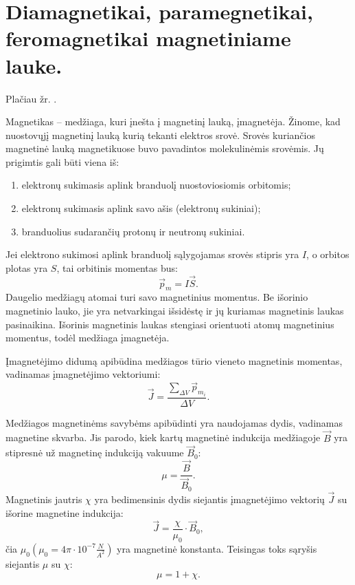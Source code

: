 \section{Diamagnetikai, paramegnetikai, feromagnetikai magnetiniame lauke.}

Plačiau žr. \cite[77p.]{elektra-magnetizmas}.

Magnetikas – medžiaga, kuri įnešta į magnetinį lauką, įmagnetėja.
Žinome, kad nuostovųjį magnetinį lauką kurią tekanti elektros
srovė. Srovės kuriančios magnetinė lauką magnetikuose buvo
pavadintos molekulinėmis srovėmis. Jų prigimtis gali būti viena iš:
\begin{enumerate}
  \item elektronų sukimasis aplink branduolį nuostoviosiomis orbitomis;
  \item elektronų sukimasis aplink savo ašis (elektronų sukiniai);
  \item branduolius sudarančių protonų ir neutronų sukiniai.
\end{enumerate}

Jei elektrono sukimosi aplink branduolį sąlygojamas srovės stipris
yra $I$, o orbitos plotas yra $S$, tai orbitinis momentas bus:
\begin{equation*}
  \vec{p}_{m} = I \vec{S}.
\end{equation*}
Daugelio medžiagų atomai turi savo magnetinius momentus. Be išorinio
magnetinio lauko, jie yra netvarkingai išsidėstę ir jų kuriamas
magnetinis laukas pasinaikina. Išorinis magnetinis laukas stengiasi
orientuoti atomų magnetinius momentus, todėl medžiaga įmagnetėja.

Įmagnetėjimo didumą apibūdina medžiagos tūrio vieneto magnetinis
momentas, vadinamas įmagnetėjimo vektoriumi:
\begin{equation*}
  \vec{J} = \frac{\sum _{\Delta V} \vec{p}_{m_{i}}}{\Delta V}.
\end{equation*}

Medžiagos magnetinėms savybėms apibūdinti yra naudojamas dydis,
vadinamas magnetine skvarba. Jis parodo, kiek kartų magnetinė
indukcija medžiagoje $\vec{B}$ yra stipresnė už magnetinę
indukciją vakuume $\vec{B}_{0}$:
\begin{equation*}
  \mu = \frac{\vec{B}}{\vec{B}_{0}}.
\end{equation*}
Magnetinis jautris $\chi$ yra bedimensinis dydis siejantis įmagnetėjimo
vektorių $\vec{J}$ su išorine magnetine indukcija:
\begin{equation*}
  \vec{J} = \frac{\chi}{\mu_{0}} \cdot \vec{B}_{0},
\end{equation*}
čia $\mu_{0} (\mu_{0} = 4\pi\cdot10^{-7}\frac{N}{A^{2}})$ yra
magnetinė konstanta. Teisingas toks sąryšis siejantis $\mu$ su
$\chi$:
\begin{equation*}
  \mu = 1 + \chi.
\end{equation*}

